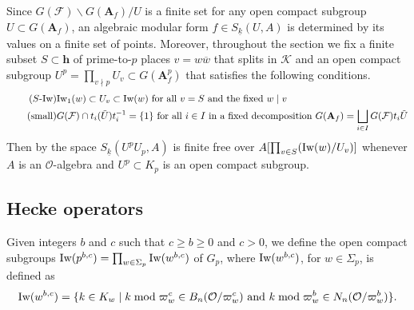 \documentclass[leqno]{amsart}
\theoremstyle{definition}
\theoremstyle{remark}
\newcommand{\oo}{\mathcal{O}}
\newcommand{\A}{\mathbf A}
\newcommand{\finite}{\mathbf{h}}
\newcommand{\F}{{\mathcal{F}}} %
\newcommand{\K}{{\mathcal{K}}} %
\newcommand{\bw}{{\overline{w}}}
\newcommand{\wt}[1]{\underline{ #1 }}
\newcommand{\Iw}{\textnormal{Iw}} %
\begin{document}
Since $G(\F)\backslash G(\A_f)/U$ is a finite set
for any open compact subgroup $U\subset G(\A_f)$,
an algebraic modular form $f\in S_{\wt{k}}(U,A)$ 
is determined by its values on a finite set of points.
Moreover, throughout the section
we fix a finite subset $S\subset \finite$
of prime-to-$p$ places $v=w\bw$ that splits in $\K$
and an open compact subgroup $U^p=\prod_{v\nmid p}U_v\subset G(\A_f^p)$ 
that satisfies the following conditions.
\begin{align}
    \label{cond:s-ram}\tag{$S$-$\Iw$}
    &\Iw_1(w)\subset U_v \subset \Iw(w) \text{ for all } 
    v=S \text{ and the fixed }w\mid v\\
    \label{cond:small}\tag{\text{small}}
	&G(\F)\cap t_i(\tilde{U})t_i^{-1}=\{1\} \text{ for all } 
    i\in I \text{ in a fixed decomposition }
    G(\A_f)=\bigsqcup_{i\in I} G(\F)t_i \tilde{U}
\end{align}
Then by \cite[Lem 2.6]{ger} the space $S_{\wt{k}}(U^pU_p,A)$
is finite free over 
$A[\prod_{v\in S}(\Iw(w)/U_v)]$
whenever $A$ is an $\oo$-algebra
and $U^p\subset K_p$ is an open compact subgroup.

\subsection{Hecke operators}

Given integers $b$ and $c$
such that $c\geq b\geq 0$ and $c>0$,
we define the open compact subgroups
$\Iw(p^{b,c})=\prod_{w\in \Sigma_p}\Iw(w^{b,c})$ of $G_p$, where 
$\Iw(w^{b,c})$, for $w\in \Sigma_p$, is defined as
\begin{equation}\label{def:Iwahori}
	\Iw(w^{b,c})=\{
	k\in K_w\mid 
    k \bmod \varpi_w^c \in B_n(\oo/\varpi_w^c)
	\text{ and }
	k \bmod \varpi_w^b \in N_n(\oo/\varpi_w^b)
	\}.
\end{equation}
\end{document}
